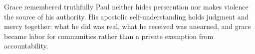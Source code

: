 \begin{studybox}{Grace remembered truthfully}
Paul neither hides persecution nor makes violence the source of his authority.
His apostolic self-understanding holds judgment and mercy together: what he
did was real, what he received was unearned, and grace became labor for
communities rather than a private exemption from accountability.
\end{studybox}
